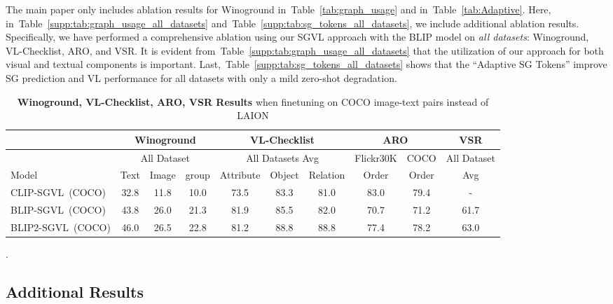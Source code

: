 \documentclass[11pt]{article}
\newcommand{\tabref}[1]{Table~\ref{#1}}
\newcommand{\tablestyle}[2]{\setlength{\tabcolsep}{#1}\renewcommand{\arraystretch}{#2}\centering\footnotesize}
\begin{document}
The main paper only includes ablation results for Winoground in~\tabref{tab:graph_usage} and in~\tabref{tab:Adaptive}. Here, in~\tabref{supp:tab:graph_usage_all_datasets} and~\tabref{supp:tab:sg_tokens_all_datasets}, we include additional ablation results. Specifically, we have performed a comprehensive ablation using our SGVL approach with the BLIP model on \textit{all datasets}: Winoground, VL-Checklist, ARO, and VSR. It is evident from~\tabref{supp:tab:graph_usage_all_datasets} that the utilization of our approach for both visual and textual components is important. Last,~\tabref{supp:tab:sg_tokens_all_datasets} shows that the ``Adaptive SG Tokens'' improve SG prediction and VL performance for all datasets with only a mild zero-shot degradation.





\begin{table*}[t!]
    \centering
	\tablestyle{4pt}{1.}
	\scriptsize
    \begin{small}
    \begin{tabular}{l|ccc|ccc|cc|c}
            \toprule
            &\multicolumn{3}{c|}{Winoground} & \multicolumn{3}{c|}{VL-Checklist} & \multicolumn{2}{c|}{ARO} & 
            \multicolumn{1}{c}{VSR}
            \\
            \toprule
            &\multicolumn{3}{c|}{All Dataset}
            &\multicolumn{3}{c|}{All Datasets Avg}
            & Flickr30K
            & COCO
            & All Dataset\\
            Model & Text & Image & group & Attribute & Object & Relation & Order & Order & Avg\\


\midrule
            CLIP-SGVL~(COCO)  & 32.8 &11.8 & 10.0  & 73.5 & 83.3 & 81.0 & 83.0 & 79.4 & -\\
            BLIP-SGVL~(COCO)  & 43.8 &26.0 & 21.3  & 81.9 & 85.5 & 82.0 & 70.7 & 71.2 & 61.7\\
            BLIP2-SGVL~(COCO)  & 46.0 &26.5 & 22.8  & 81.2 & 88.8 & 88.8 & 77.4 & 78.2 & 63.0\\
            \bottomrule
    
    \end{tabular}
    \end{small}
\caption{\textbf{Winoground, VL-Checklist, ARO, VSR Results} when finetuning on COCO image-text pairs instead of LAION}.
\label{tab:res_coco}
\end{table*} 

\subsection{Additional Results}
\label{supp:expr:more_results}
\end{document}
